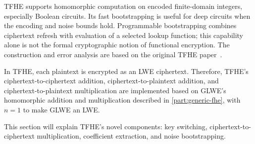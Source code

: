 
TFHE supports homomorphic computation on encoded finite-domain integers, especially Boolean circuits. Its fast bootstrapping is useful for deep circuits when the encoding and noise bounds hold. Programmable bootstrapping combines ciphertext refresh with evaluation of a selected lookup function; this capability alone is not the formal cryptographic notion of functional encryption. The construction and error analysis are based on the original TFHE paper~\cite{tfhe-original}.

In TFHE, each plaintext is encrypted as an LWE ciphertext. Therefore, TFHE's ciphertext-to-ciphertext addition, ciphertext-to-plaintext addition, and ciphertext-to-plaintext multiplication are implemented based on GLWE's homomorphic addition and multiplication described in \autoref{part:generic-fhe}, with $n = 1$ to make GLWE an LWE.

This section will explain TFHE's novel components: key switching, ciphertext-to-ciphertext multiplication, coefficient extraction, and noise bootstrapping. 

$ $

